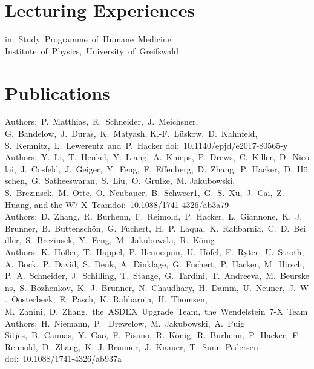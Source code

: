 \documentclass[11pt,a4paper]{moderncv}
\begin{document}
    \section{Lecturing Experiences}
        {in:~Study~Programme~of~Humane~Medicine\newline}{}%
        {Institute~of~Physics,~University~of~Greifswald}{}


    \section{Publications}
        {Authors:~P.~Matthias,~R.~Schneider,~J.~Meichsner,~%
         G.~Bandelow,~J.~Duras,~K.~Matyash, K.-F.~Lüskow,~D.~Kahnfeld,~%
         S.~Kemnitz,~L.~Lewerentz~and~P.~Hacker}{%
            doi:~10.1140/epjd/e2017-80565-y}{}{}
        {Authors:~Y.~Li,~T.~Henkel,~Y.~Liang,~A.~Knieps,~P.~Drews,~C.~Killer,~D.~Nicolai,~J.~Cosfeld,~J.~Geiger,~Y.~Feng,~F.~Effenberg,~D.~Zhang,~P.~Hacker,~D.~Höschen,~G.~Satheeswaran,~S.~Liu,~O.~Grulke,~M. Jakubowski, S.~Brezinsek,~M.~Otte,~O.~Neubauer,~B.~Schweer1,~G.~S.~Xu,~J.~Cai,~Z. Huang, and the W7-X~Team}{doi:~10.1088/1741-4326/ab3a79}{}{}
        {Authors:~D.~Zhang,~R.~Burhenn,~F.~Reimold,~P.~Hacker,~L.~Giannone,~K.~J.~Brunner,~B.~Buttenschön,~G.~Fuchert,~H.~P.~Laqua,~K.~Rahbarnia,~C.~D.~Beidler,~S.~Brezinsek,~Y.~Feng,~M.~Jakubowski,~R.~König}{}{}{}
        {Authors:~K.~Höfler,~T.~Happel,~P.~Hennequin,~U.~Höfel,~F.~Ryter,~U.~Stroth,~A.~Bock,~P.~David,~S.~Denk,~A.~Dinklage,~G.~Fuchert,~P.~Hacker,~M.~Hirsch,~P.~A.~Schneider,~J.~Schilling,~T.~Stange,~G.~Tardini,~T.~Andreeva,~M.~Beurskens,~S.~Bozhenkov,~K.~J.~Brunner,~N.~Chaudhary,~H.~Damm,~U.~Neuner,~J.~W.~Oosterbeek,~E.~Pasch,~K.~Rahbarnia,~H.~Thomsen, M.~Zanini,~D.~Zhang,~the~ASDEX~Upgrade~Team,~the~Wendelstein~7-X~Team}{}{}{}
        {Authors:~H.~Niemann,~P.~ Drewelow,~M.~Jakubowski,~A.~Puig Sitjes,~B.~Cannas,~Y.~Gao,~F.~Pisano,~R.~König,~R.~Burhenn,~P.~Hacker,~F.~Reimold,~D.~Zhang,~K.~J. Brunner,~J.~Knauer,~T.~Sunn~Pedersen}{%
        doi:~10.1088/1741-4326/ab937a}{}{}
\end{document}
